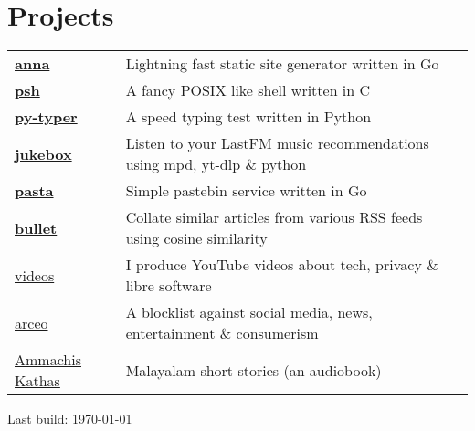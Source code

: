 \documentclass[letter,12pt]{article}
\begin{document}
\section{Projects}
\begin{tabularx}{\linewidth}{@{}l X@{}}
    \textbf{\href{https://github.com/anna-ssg/anna}{anna}} & Lightning fast static site generator written in Go \\
    \textbf{\href{https://github.com/psh-shell/psh}{psh}} & A fancy POSIX like shell written in C \\
    \textbf{\href{https://github.com/polarhive/py-typer}{py-typer}} & A speed typing test written in Python \\
    \textbf{\href{https://github.com/polarhive/jukebox}{jukebox}} & Listen to your LastFM music recommendations using mpd, yt-dlp \& python \\
    \textbf{\href{https://polarhive.net/pasta}{pasta}} & Simple pastebin service written in Go \\
    \textbf{\href{https://polarhive.net/bullet}{bullet}} & Collate similar articles from various RSS feeds using cosine similarity    \\
    \href{https://polarhive.net/videos}{videos} & I produce YouTube videos about tech, privacy \& libre software \\
    \href{https://polarhive.net/arceo}{arceo} & A blocklist against social media, news, entertainment \& consumerism \\
    \href{https://polarhive.net/ammachiskathas}{Ammachis Kathas} & Malayalam short stories (an audiobook) \\
\end{tabularx}

\vfill
\href{https://github.com/polarhive/resume}{} Last build: \today
\end{document}
